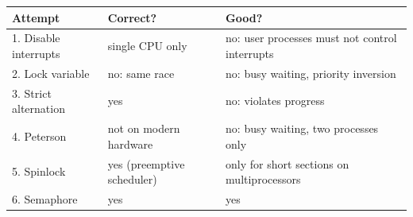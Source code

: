 \begin{center}
\small
\begin{tabular}{lll}
  \toprule
  Attempt & Correct? & Good? \\
  \midrule
  1. Disable interrupts & single CPU only & no: user processes must not control interrupts \\
  2. Lock variable & no: same race & no: busy waiting, priority inversion \\
  3. Strict alternation & yes & no: violates progress \\
  4. Peterson & not on modern hardware & no: busy waiting, two processes only \\
  5. Spinlock & yes (preemptive scheduler) & only for short sections on multiprocessors \\
  6. Semaphore & yes & yes \\
  \bottomrule
\end{tabular}
\end{center}
